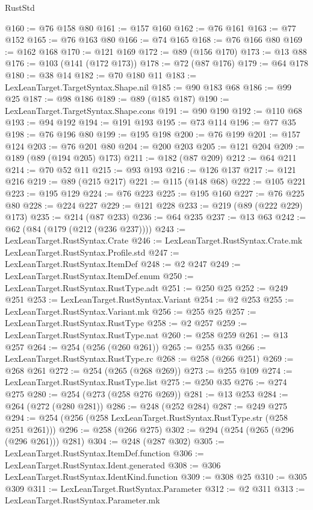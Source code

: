 \begin{lexlean}{RustStd}
\begin{coremodule}
@160 := @76 @158 @80
@161 := @157 @160
@162 := @76 @161
@163 := @77 @152
@165 := @76 @163 @80
@166 := @74 @165
@168 := @76 @166 @80
@169 := @162 @168
@170 := @121 @169
@172 := @89 (@156 @170)
@173 := @13 @88
@176 := @103 (@141 (@172 @173))
@178 := @72 (@87 @176)
@179 := @64 @178
@180 := @38 @14
@182 := @70 @180 @11
@183 := LexLeanTarget.TargetSyntax.Shape.nil
@185 := @90 @183 @68
@186 := @99 @25
@187 := @98 @186
@189 := @89 (@185 @187)
@190 := LexLeanTarget.TargetSyntax.Shape.cons
@191 := @90 @190
@192 := @110 @68
@193 := @94 @192
@194 := @191 @193
@195 := @73 @114
@196 := @77 @35
@198 := @76 @196 @80
@199 := @195 @198
@200 := @76 @199
@201 := @157 @124
@203 := @76 @201 @80
@204 := @200 @203
@205 := @121 @204
@209 := @189 (@89 (@194 @205) @173)
@211 := @182 (@87 @209)
@212 := @64 @211
@214 := @70 @52 @11
@215 := @93 @193
@216 := @126 @137
@217 := @121 @216
@219 := @89 (@215 @217)
@221 := @115 (@148 @68)
@222 := @105 @221
@223 := @195 @129
@224 := @76 @223
@225 := @195 @160
@227 := @76 @225 @80
@228 := @224 @227
@229 := @121 @228
@233 := @219 (@89 (@222 @229) @173)
@235 := @214 (@87 @233)
@236 := @64 @235
@237 := @13 @63
@242 := @62 (@84 (@179 (@212 (@236 @237))))
@243 := LexLeanTarget.RustSyntax.Crate
@246 := LexLeanTarget.RustSyntax.Crate.mk LexLeanTarget.RustSyntax.Profile.std
@247 := LexLeanTarget.RustSyntax.ItemDef
@248 := @2 @247
@249 := LexLeanTarget.RustSyntax.ItemDef.enum
@250 := LexLeanTarget.RustSyntax.RustType.adt
@251 := @250 @25
@252 := @249 @251
@253 := LexLeanTarget.RustSyntax.Variant
@254 := @2 @253
@255 := LexLeanTarget.RustSyntax.Variant.mk
@256 := @255 @25
@257 := LexLeanTarget.RustSyntax.RustType
@258 := @2 @257
@259 := LexLeanTarget.RustSyntax.RustType.nat
@260 := @258 @259
@261 := @13 @257
@264 := @254 (@256 (@260 @261))
@265 := @255 @35
@266 := LexLeanTarget.RustSyntax.RustType.rc
@268 := @258 (@266 @251)
@269 := @268 @261
@272 := @254 (@265 (@268 @269))
@273 := @255 @109
@274 := LexLeanTarget.RustSyntax.RustType.list
@275 := @250 @35
@276 := @274 @275
@280 := @254 (@273 (@258 @276 @269))
@281 := @13 @253
@284 := @264 (@272 (@280 @281))
@286 := @248 (@252 @284)
@287 := @249 @275
@294 := @254 (@256 (@258 LexLeanTarget.RustSyntax.RustType.str (@258 @251 @261)))
@296 := @258 (@266 @275)
@302 := @294 (@254 (@265 (@296 (@296 @261))) @281)
@304 := @248 (@287 @302)
@305 := LexLeanTarget.RustSyntax.ItemDef.function
@306 := LexLeanTarget.RustSyntax.Ident.generated
@308 := @306 LexLeanTarget.RustSyntax.IdentKind.function
@309 := @308 @25
@310 := @305 @309
@311 := LexLeanTarget.RustSyntax.Parameter
@312 := @2 @311
@313 := LexLeanTarget.RustSyntax.Parameter.mk

\end{coremodule}
\end{lexlean}

